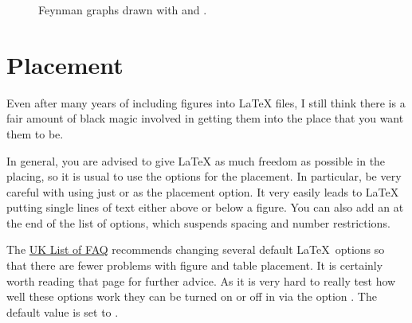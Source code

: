 \begin{figure}[htbp]
  \centering
  \begin{minipage}[b]{0.5\figwidth}
    \centering
    
     {%
    }{
    }
    \label{fig:feyn:feynmp}
  \end{minipage}
  \qquad
  \begin{minipage}[b]{0.5\figwidth}
    \centering
     {%
    }{%
      
    }
    \subcaption{\TikZ}\label{fig:feyn:tikz}
  \end{minipage}
  \caption{Feynman graphs drawn with  and .}
  \label{fig:feyn:cf}
\end{figure}


\section{Placement}
\label{sec:fig:placement}

Even after many years of including figures into \LaTeX{} files, I
still think there is a fair amount of black magic involved in getting
them into the place that you want them to be.

In general, you are advised to give \LaTeX{} as much freedom as
possible in the placing, so it is usual to use the options
\Option{[htbp]} for the placement. In particular, be very careful with
using just \Option{[h]} or \Option{[H]} as the placement option. It very
easily leads to \LaTeX{} putting single lines of text either above or
below a figure. You can also add an \Option{!} at the end of the list
of options, which suspends spacing and number restrictions.

The
\href{http://www.tex.ac.uk/cgi-bin/texfaq2html?label=floats}{UK List of FAQ}
recommends changing several default \LaTeX\ options so that there are fewer problems
with figure and table placement.
It is certainly worth reading that page for further advice.
As it is very hard to really test how well these options work
they can be turned on or off in  via the option .
The default value is set to .

